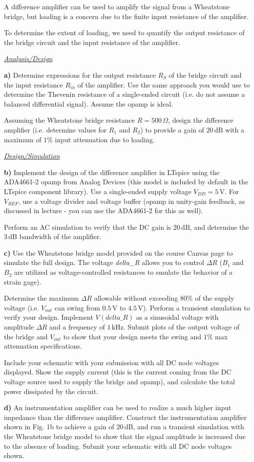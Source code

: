 \documentclass[11pt, a4paper]{article}
\begin{document}
A difference amplifier can be used to amplify the signal from a Wheatstone bridge, but loading is a concern due to the finite input resistance of the amplifier.

To determine the extent of loading, we need to quantify the output resistance of the bridge circuit and the input resistance of the amplifier.

\underline{\textit{Analysis/Design}}

\textbf{a)} Determine expressions for the output resistance $R_S$ of the bridge circuit and the input resistance $R_{in}$ of the amplifier. Use the same approach you would use to determine the Thevenin resistance of a single-ended circuit (i.e. do not assume a balanced differential signal). Assume the opamp is ideal.

Assuming the Wheatstone bridge resistance $R = 500\,\Omega$, design the difference amplifier (i.e. determine values for $R_1$ and $R_2$) to provide a gain of $20\,\text{dB}$ with a maximum of $1\%$ input attenuation due to loading.

\underline{\textit{Design/Simulation}}

\textbf{b)} Implement the design of the difference amplifier in LTspice using the ADA4661-2 opamp from Analog Devices (this model is included by default in the LTspice component library). Use a single-ended supply voltage $V_{DD} = 5\,\text{V}$. For $V_{REF}$, use a voltage divider and voltage buffer (opamp in unity-gain feedback, as discussed in lecture - you can use the ADA4661-2 for this as well).

Perform an AC simulation to verify that the DC gain is $20\,\text{dB}$, and determine the $3\,\text{dB}$ bandwidth of the amplifier.

\textbf{c)} Use the Wheatstone bridge model provided on the course Canvas page to simulate the full design. The voltage \textit{delta\_R} allows you to control $\Delta R$ ($B_1$ and $B_2$ are utilized as voltage-controlled resistances to emulate the behavior of a strain gage).

Determine the maximum $\Delta R$ allowable without exceeding $80\%$ of the supply voltage (i.e. $V_{out}$ can swing from $0.5\,\text{V}$ to $4.5\,\text{V}$). Perform a transient simulation to verify your design. Implement $V(delta\_R)$ as a sinusoidal voltage with amplitude $\Delta R$ and a frequency of $1\,\text{kHz}$. Submit plots of the output voltage of the bridge and $V_{out}$ to show that your design meets the swing and $1\%$ max attenuation specifications.

Include your schematic with your submission with all DC node voltages displayed. Show the supply current (this is the current coming from the DC voltage source used to supply the bridge and opamp), and calculate the total power dissipated by the circuit.

\textbf{d)} An instrumentation amplifier can be used to realize a much higher input impedance than the difference amplifier. Construct the instrumentation amplifier shown in Fig. 1b to achieve a gain of $20\,\text{dB}$, and run a transient simulation with the Wheatstone bridge model to show that the signal amplitude is increased due to the absence of loading. Submit your schematic with all DC node voltages shown.
\end{document}
